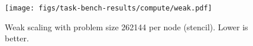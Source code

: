 \begin{figure}[t]
\centering
\texttt{[image: figs/task-bench-results/compute/weak.pdf]}
\vspace{-0.5cm}
\caption{Weak scaling with problem size 262144 per node (stencil). Lower is better.\label{fig:weak-scaling}}
\vspace{-0.05cm}
\end{figure}
